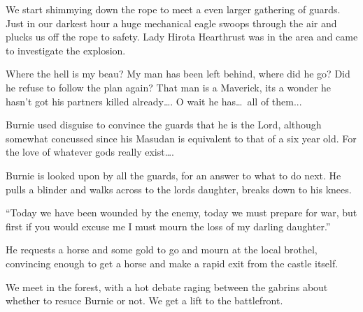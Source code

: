 We start shimmying down the rope to meet a even larger gathering of guards. Just in our darkest hour a huge mechanical eagle swoops through the air and plucks us off the rope to safety. Lady Hirota Hearthrust was in the area and came to investigate the explosion.\medskip

Where the hell is my beau? My man has been left behind, where did he go? Did he refuse to follow the plan again? That man is a Maverick, its a wonder he hasn't got his partners killed already\ldots. O wait he has\ldots\ all of them...\medskip

Burnie used disguise to convince the guards that he is the Lord, although somewhat concussed since his Masudan is equivalent to that of a six year old. For the love of whatever gods really exist\ldots.\medskip

Burnie is looked upon by all the guards, for an answer to what to do next. He pulls a blinder and walks across to the lords daughter, breaks down to his knees.\medskip

``Today we have been wounded by the enemy, today we must prepare for war, but first if you would excuse me I must mourn the loss of my darling daughter.''\medskip

He requests a horse and some gold to go and mourn at the local brothel, convincing enough to get a horse and make a rapid exit from the castle itself.\medskip

We meet in the forest, with a hot debate raging between the gabrins about whether to resuce Burnie or not. We get a lift to the battlefront.

\vspace*{5mm}
